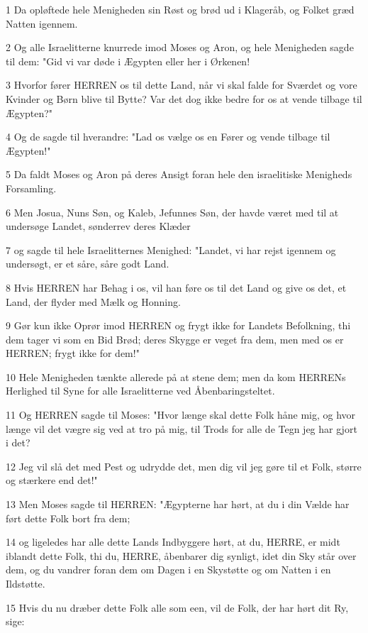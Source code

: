 \par 1 Da opløftede hele Menigheden sin Røst og brød ud i Klageråb, og Folket græd Natten igennem.
\par 2 Og alle Israelitterne knurrede imod Moses og Aron, og hele Menigheden sagde til dem: "Gid vi var døde i Ægypten eller her i Ørkenen!
\par 3 Hvorfor fører HERREN os til dette Land, når vi skal falde for Sværdet og vore Kvinder og Børn blive til Bytte? Var det dog ikke bedre for os at vende tilbage til Ægypten?"
\par 4 Og de sagde til hverandre: "Lad os vælge os en Fører og vende tilbage til Ægypten!"
\par 5 Da faldt Moses og Aron på deres Ansigt foran hele den israelitiske Menigheds Forsamling.
\par 6 Men Josua, Nuns Søn, og Kaleb, Jefunnes Søn, der havde været med til at undersøge Landet, sønderrev deres Klæder
\par 7 og sagde til hele Israelitternes Menighed: "Landet, vi har rejst igennem og undersøgt, er et såre, såre godt Land.
\par 8 Hvis HERREN har Behag i os, vil han føre os til det Land og give os det, et Land, der flyder med Mælk og Honning.
\par 9 Gør kun ikke Oprør imod HERREN og frygt ikke for Landets Befolkning, thi dem tager vi som en Bid Brød; deres Skygge er veget fra dem, men med os er HERREN; frygt ikke for dem!"
\par 10 Hele Menigheden tænkte allerede på at stene dem; men da kom HERRENs Herlighed til Syne for alle Israelitterne ved Åbenbaringsteltet.
\par 11 Og HERREN sagde til Moses: "Hvor længe skal dette Folk håne mig, og hvor længe vil det vægre sig ved at tro på mig, til Trods for alle de Tegn jeg har gjort i det?
\par 12 Jeg vil slå det med Pest og udrydde det, men dig vil jeg gøre til et Folk, større og stærkere end det!"
\par 13 Men Moses sagde til HERREN: "Ægypterne har hørt, at du i din Vælde har ført dette Folk bort fra dem;
\par 14 og ligeledes har alle dette Lands Indbyggere hørt, at du, HERRE, er midt iblandt dette Folk, thi du, HERRE, åbenbarer dig synligt, idet din Sky står over dem, og du vandrer foran dem om Dagen i en Skystøtte og om Natten i en Ildstøtte.
\par 15 Hvis du nu dræber dette Folk alle som een, vil de Folk, der har hørt dit Ry, sige:
